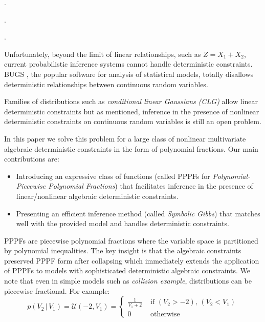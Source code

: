 \documentclass{article}
\newcommand{\case}[2]{#2 &\text{ if } #1}%
\newcommand{\otherwise}[1]{#1 &\text{ otherwise}}
\newcommand{\pr}{p}
\begin{document}

.

.

.

Unfortunately, 
beyond the limit of linear relationships, such as $Z = X_1 + X_2$, 
current probabilistic inference systems cannot handle deterministic constraints.
BUGS \cite{lunn2009bugs}, the popular software for analysis of statistical models, 
totally disallows deterministic relationships between continuous random variables.

Families of distributions such as \emph{conditional linear Gaussians (CLG)} \cite{lauritzen2001stable}
allow linear deterministic constraints but as mentioned, inference in the presence of nonlinear deterministic constraints on continuous random variables is still an open problem.

In this paper we solve this problem for a large class of nonlinear multivariate algebraic deterministic constraints in the form of polynomial fractions. 
Our main contributions are:
\begin{itemize}
\item Introducing  an expressive class of functions 
(called PPPFs for \emph{Polynomial-Piecewise Polynomial Fractions}) that facilitates inference in the presence of  linear/nonlinear algebraic deterministic constraints.
\item Presenting an efficient inference method (called \emph{Symbolic Gibbs}) that matches well with the provided model and handles deterministic constraints.  
\end{itemize}

PPPFs are piecewise polynomial fractions where the variable space is partitioned by polynomial inequalities.
The key insight is that the algebraic constraints preserved PPPF form after collapsing which immediately extends the application of PPPFs to models with sophisticated deterministic algebraic constraints. 
We note that 
even in simple models such as \emph{collision example}, distributions can be piecewise fractional. 
For example:  
\[
\pr(V_2 \,|\, V_1) = \mathcal{U}(-2, V_1)
=
\begin{cases}
  \case{\scriptstyle (V_2 > -2), \, (V_2 < V_1)}{\frac{1}{V_1 + 2}}\\
 \otherwise{0}
 \end{cases}
\]
\end{document}
